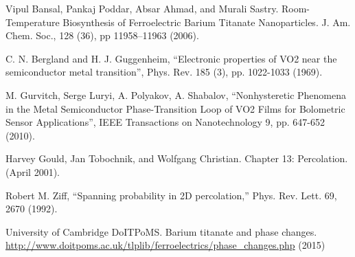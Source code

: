 \documentclass[%
 reprint,
 amsmath,amssymb,
 aps,
 pra,
]{revtex4-1}
\begin{document}
\begin{thebibliography}{6}
	Vipul Bansal, Pankaj Poddar, Absar Ahmad, and Murali Sastry. Room-Temperature Biosynthesis of Ferroelectric Barium Titanate Nanoparticles. J. Am. Chem. Soc., 128 (36), pp 11958–11963 (2006).
	
	C. N. Bergland and H. J. Guggenheim, “Electronic properties of VO2 near the semiconductor metal transition”, Phys. Rev. 185 (3), pp. 1022-1033 (1969).
	
	M. Gurvitch, Serge Luryi, A. Polyakov, A. Shabalov, “Nonhysteretic Phenomena in the Metal Semiconductor Phase-Transition Loop of VO2 Films for Bolometric Sensor Applications”, IEEE Transactions on Nanotechnology 9, pp. 647-652 (2010).
	
	Harvey Gould, Jan Tobochnik, and Wolfgang Christian. Chapter 13: Percolation. (April 2001).
	
	Robert M. Ziff, “Spanning probability in 2D percolation,” Phys. Rev. Lett. 69, 2670 (1992).
	
	University of Cambridge DoITPoMS. Barium titanate and phase changes. \url{http://www.doitpoms.ac.uk/tlplib/ferroelectrics/phase_changes.php} (2015)

\end{thebibliography}
\end{document}
